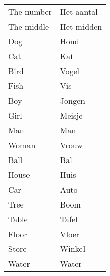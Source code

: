 \documentclass[letterpaper,11pt]{article}
\begin{document}
\begin{tabular}[t]{|l | l|}
    The number            & Het aantal      \\
    The middle            & Het midden      \\
    Dog                   & Hond            \\
    Cat                   & Kat             \\
    Bird                  & Vogel           \\
    Fish                  & Vis             \\
    Boy                   & Jongen          \\
    Girl                  & Meisje          \\
    Man                   & Man             \\
    Woman                 & Vrouw           \\
    Ball                  & Bal             \\
    House                 & Huis            \\
    Car                   & Auto            \\
    Tree                  & Boom            \\
    Table                 & Tafel           \\
    Floor                 & Vloer           \\
    Store                 & Winkel          \\
    Water                 & Water           \\
    \hline
\end{tabular}
\end{document}
